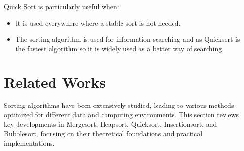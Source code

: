 \documentclass[sigplan,screen]{acmart}
\begin{document}
Quick Sort is particularly useful when:
\begin{itemize}
    \item It is used everywhere where a stable sort is not needed.
    \item The sorting algorithm is used for information searching 
    and as Quicksort is the fastest algorithm so it is widely used as a better way of searching.
\end{itemize}





\section{ Related Works}

Sorting algorithms have been extensively studied, leading to various methods 
optimized for different data and computing environments. This section reviews 
key developments in Mergesort, Heapsort, Quicksort, Insertionsort, and Bubblesort, 
focusing on their theoretical foundations and practical implementations.
\end{document}
